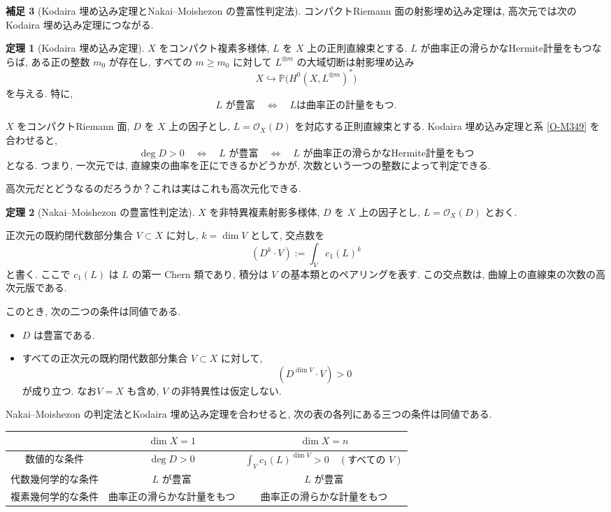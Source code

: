 \documentclass[dvipdfmx,a4paper,11pt]{article} %
\theoremstyle{definition}
\newtheorem{thm}{定理}[section]
\numberwithin{equation}{section}
\newtheorem{rem}[thm]{補足}
\begin{document}
\begin{rem}[Kodaira 埋め込み定理とNakai--Moishezon の豊富性判定法]


コンパクトRiemann 面の射影埋め込み定理は, 
高次元では次のKodaira 埋め込み定理につながる.

\begin{thm}[Kodaira 埋め込み定理]
$X$ をコンパクト複素多様体, $L$ を $X$ 上の正則直線束とする.
$L$ が曲率正の滑らかなHermite計量をもつならば, 
ある正の整数 $m_0$ が存在し, すべての $m\geq m_0$ に対して
$L^{\otimes m}$ の大域切断は射影埋め込み
\[
X\hookrightarrow
\mathbb P\bigl(H^0(X,L^{\otimes m})^*\bigr)
\]
を与える.
特に, 
\[
\text{$L$ が豊富}
\quad\Longleftrightarrow\quad
\text{$L$は曲率正の計量をもつ}.
\]
\end{thm}
$X$ をコンパクトRiemann 面, $D$ を $X$ 上の因子とし, 
$L=\mathcal O_X(D)$ を対応する正則直線束とする.
Kodaira 埋め込み定理と系 \ref{O-M349} を合わせると, 
\[
\deg D>0
\quad\Longleftrightarrow\quad
L\text{ が豊富}
\quad\Longleftrightarrow\quad
L\text{ が曲率正の滑らかなHermite計量をもつ}
\]
となる.
つまり, 一次元では, 直線束の曲率を正にできるかどうかが, 
次数という一つの整数によって判定できる.

高次元だとどうなるのだろうか？これは実はこれも高次元化できる. 
\begin{thm}[Nakai--Moishezon の豊富性判定法]
$X$ を非特異複素射影多様体, 
$D$ を $X$ 上の因子とし, $L=\mathcal O_X(D)$ とおく.

正次元の既約閉代数部分集合 $V\subset X$ に対し, 
$k=\dim V$ として, 交点数を
\[
(D^k\cdot V):=\int_V c_1(L)^k
\]
と書く.
ここで $c_1(L)$ は $L$ の第一 Chern 類であり, 
積分は $V$ の基本類とのペアリングを表す.
この交点数は, 曲線上の直線束の次数の高次元版である.

このとき, 次の二つの条件は同値である.
\begin{itemize}
\item $D$ は豊富である.
\item すべての正次元の既約閉代数部分集合 $V\subset X$ に対して, 
\[
(D^{\dim V}\cdot V)>0
\]
が成り立つ. なお$V=X$ も含め, $V$ の非特異性は仮定しない.
\end{itemize}
\end{thm}


Nakai--Moishezon の判定法とKodaira 埋め込み定理を合わせると, 
次の表の各列にある三つの条件は同値である.

\begin{center}
\renewcommand{\arraystretch}{1.6}
\begin{tabular}{c|c|c}
 & $\dim X=1$ & $\dim X=n$ \\ \hline
数値的な条件
& $\deg D>0$
& $\displaystyle
   \int_V c_1(L)^{\dim V}>0
   \quad(\text{すべての }V)$ \\[3pt]
代数幾何学的な条件
& $L$ が豊富
& $L$ が豊富 \\
複素幾何学的な条件
& 曲率正の滑らかな計量をもつ
& 曲率正の滑らかな計量をもつ
\end{tabular}
\end{center}
\end{rem}
\end{document}
